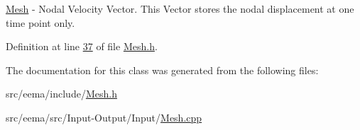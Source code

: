 \hyperlink{class_mesh}{Mesh} -\/ Nodal Velocity Vector. This Vector stores the nodal displacement at one time point only. 

Definition at line \hyperlink{_mesh_8h_source_l00037}{37} of file \hyperlink{_mesh_8h_source}{Mesh.\+h}.



The documentation for this class was generated from the following files\+:\begin{DoxyCompactItemize}
\item 
src/eema/include/\hyperlink{_mesh_8h}{Mesh.\+h}\item 
src/eema/src/\+Input-\/\+Output/\+Input/\hyperlink{_mesh_8cpp}{Mesh.\+cpp}\end{DoxyCompactItemize}
